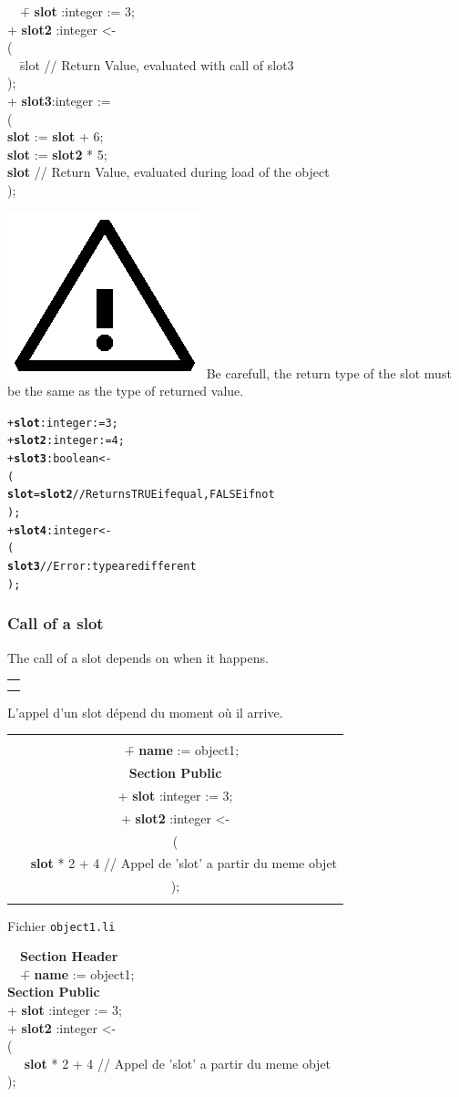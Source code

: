 \documentclass[11pt]{mybook}
\newcommand{\warning}{\includegraphics[scale=0.3]{figures/warning}}
\newcommand{\fr}[1]{
  \if \frenchversion 1
    \if \englishversion 1    
    \vspace{2mm}
    \noindent\begin{tabular}{|c}
      {
        \begin{minipage}{15.5cm}
          \textit{#1}
        \end{minipage}
      }
    \end{tabular}
    \else
    #1
    \fi
  \fi
}
\newcommand{\en}[1]
{
  \if \englishversion 1
  #1
  \fi
}
\begin{document}
{{\tt\begin{tabbing}
~~\= + {\bf{}slot}  :{\sc{}integer}  := 3;\\
  \> + {\bf{}slot2} :{\sc{}integer}  <-\\
  \> (\\
  \>~~\= slot              // Return Value, evaluated with call of slot3\\
  \> );\\
  \> + {\bf{}slot3}:{\sc{}integer}  :=\\
  \> (\\
  \>  \> {\bf{}slot} := {\bf{}slot} + 6;\\
  \>  \> {\bf{}slot} := {\bf{}slot2} * 5; \\
  \>  \> {\bf{}slot}              // Return Value, evaluated during load of the object\\
  \> );
\end{tabbing}}

\warning{} Be carefull, the return type of the slot must be the same as the type of returned value.

\begin{alltt}
  + {\bf{}slot}  :{\sc{}integer}  := 3;
  + {\bf{}slot2} :{\sc{}integer}  := 4;
  + {\bf{}slot3} :{\sc{}boolean}  <-
  (
     {\bf{}slot} = {\bf{}slot2}            // Returns TRUE if equal, FALSE if not
  );
  + {\bf{}slot4}:{\sc{}integer}  <-
  (
    {\bf{}slot3}                     // Error: type are different   
  );
\end{alltt}
}
\subsubsection{Call of a slot}
\label{quickstart:slots:methods_functions:call_slot}
%
\en{The call of a slot depends on when it happens.\\}
\fr{L'appel d'un slot d\'epend du moment o\`u il arrive.\\}

\fr{
Fichier {\tt{}object1.li}
{\tt\begin{tabbing}
~~\= {\bf{}Section Header}\\
  \>~~\= + {\bf{}name} := {\sc{}object1};\\
  \> {\bf{}Section Public}\\
  \>  \> + {\bf{}slot} :{\sc{}integer}  := 3;\\
  \>  \> + {\bf{}slot2} :{\sc{}integer}  <-\\
  \>  \> (\\
  \>  \>~~ {\bf{}slot} * 2 + 4                  // Appel de 'slot' a partir du meme objet\\
  \>  \> );\\
\end{tabbing}}
}
\end{document}
